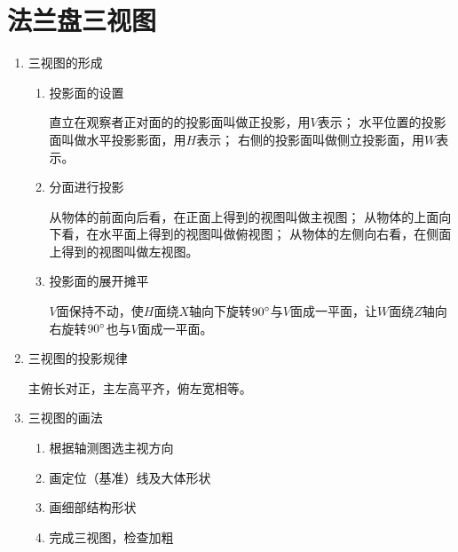\section{法兰盘三视图}
\begin{enumerate}
\item 三视图的形成
\begin{enumerate}
\item 投影面的设置

直立在观察者正对面的的投影面叫做正投影，用$V$表示；
水平位置的投影面叫做水平投影影面，用$H$表示；
右侧的投影面叫做侧立投影面，用$W$表示。
\item 分面进行投影

从物体的前面向后看，在正面上得到的视图叫做主视图；
从物体的上面向下看，在水平面上得到的视图叫做俯视图；
从物体的左侧向右看，在侧面上得到的视图叫做左视图。
\item 投影面的展开摊平

$V$面保持不动，使$H$面绕$X$轴向下旋转$90\degree$与$V$面成一平面，让$W$面绕$Z$轴向右旋转$90\degree$也与$V$面成一平面。
\end{enumerate}
\item 三视图的投影规律

主俯长对正，主左高平齐，俯左宽相等。
\item 三视图的画法
\begin{enumerate}
\item 根据轴测图选主视方向
\item 画定位（基准）线及大体形状
\item 画细部结构形状
\item 完成三视图，检查加粗
\end{enumerate}
\end{enumerate}

\endinput